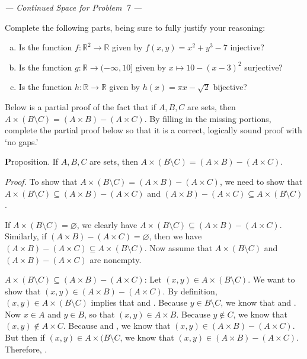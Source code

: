 \documentclass[12pt,letterpaper]{exam}
\newcommand{\blank}[1]{\underline{\hspace{#1}}} %
\begin{document}
\begin{questions}
\newpage 
\begin{center} {\itshape --- Continued Space for Problem~7 ---} \end{center}
\newpage

	

\newpage
\question[10] Complete the following parts, being sure to fully justify your reasoning:
	\begin{enumerate}[(a)]
	\item Is the function $f: \mathbb{R}^2 \to \mathbb{R}$ given by $f(x, y)= x^2 + y^3 - 7$ injective?
	\item Is the function $g: \mathbb{R} \to (-\infty, 10]$ given by $x \mapsto 10 - (x - 3)^2$ surjective?
	\item Is the function $h: \mathbb{R} \to \mathbb{R}$ given by $h(x)= \pi x - \sqrt{2}$ bijective? 
	\end{enumerate}



\newpage
\question[10] Below is a partial proof of the fact that if $A, B, C$ are sets, then $A \times (B \setminus C)= (A \times B) - (A \times C)$. By filling in the missing portions, complete the partial proof below so that it is a correct, logically sound proof with `no gaps.' \pspace

{\textbf Proposition.} If $A, B, C$ are sets, then $A \times (B \setminus C)= (A \times B) - (A \times C)$. \pspace

{\itshape Proof.} To show that $A \times (B \setminus C)= (A \times B) - (A \times C)$, we need to show that $A \times (B \setminus C) \subseteq (A \times B) - (A \times C)$ and $(A \times B) - (A \times C) \subseteq A \times (B \setminus C)$. \par\vspace{2\baselineskip}

If $A \times (B \setminus C)= \varnothing$, we clearly have $A \times (B \setminus C) \subseteq (A \times B) - (A \times C)$. Similarly, if $(A \times B) - (A \times C)= \varnothing$, then we have $(A \times B) - (A \times C) \subseteq A \times (B \setminus C)$. Now assume that $A \times (B \setminus C)$ and $(A \times B) - (A \times C)$ are nonempty. \par\vspace{2\baselineskip}

$A \times (B \setminus C) \subseteq (A \times B) - (A \times C)$: Let $(x, y) \in A \times (B \setminus C)$. We want to show that \pspace $(x, y) \in (A \times B) - (A \times C)$. By definition, $(x, y) \in A \times (B \setminus C)$ implies that \blank{3cm} \pspace and \blank{3cm}. Because $y \in B \setminus C$, we know that \blank{4cm} and \pspace \blank{4cm}. Now $x \in A$ and $y \in B$, so that $(x, y) \in A \times B$. Because $y \notin C$, \pspace we know that $(x, y) \notin A \times C$. Because \blank{4cm} and \blank{4cm}, \pspace we know that $(x, y) \in (A \times B) - (A \times C)$. But then if $(x, y) \in A \times (B \setminus C$, we know \pspace that $(x, y) \in (A \times B) - (A \times C)$. Therefore, \blank{6cm}. \par\vspace{2\baselineskip}


\end{questions}
\end{document}
